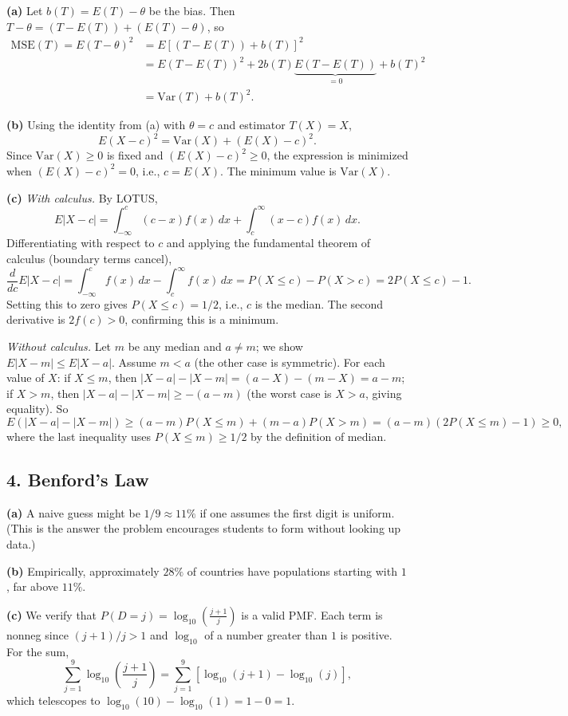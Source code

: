 \documentclass{article}
\begin{document}
\textbf{(a)} Let $b(T) = E(T) - \theta$ be the bias. Then $T - \theta = (T - E(T)) + (E(T) - \theta)$, so
\begin{align*}
\text{MSE}(T) = E(T-\theta)^2 &= E\!\left[(T-E(T)) + b(T)\right]^2 \\
&= E(T-E(T))^2 + 2b(T)\underbrace{E(T-E(T))}_{=0} + b(T)^2 \\
&= \text{Var}(T) + b(T)^2.
\end{align*}

\textbf{(b)} Using the identity from (a) with $\theta = c$ and estimator $T(X) = X$,
$$
E(X - c)^2 = \text{Var}(X) + (E(X) - c)^2.
$$
Since $\text{Var}(X) \ge 0$ is fixed and $(E(X)-c)^2 \ge 0$, the expression is minimized when $(E(X)-c)^2 = 0$, i.e., $c = E(X)$. The minimum value is $\text{Var}(X)$.

\textbf{(c)} \emph{With calculus.} By LOTUS,
$$
E|X - c| = \int_{-\infty}^c (c-x)f(x)\,dx + \int_c^{\infty}(x-c)f(x)\,dx.
$$
Differentiating with respect to $c$ and applying the fundamental theorem of calculus (boundary terms cancel),
$$
\frac{d}{dc}E|X-c| = \int_{-\infty}^c f(x)\,dx - \int_c^{\infty}f(x)\,dx = P(X \le c) - P(X > c) = 2P(X \le c) - 1.
$$
Setting this to zero gives $P(X \le c) = 1/2$, i.e., $c$ is the median. The second derivative is $2f(c) > 0$, confirming this is a minimum.

\emph{Without calculus.} Let $m$ be any median and $a \ne m$; we show $E|X - m| \le E|X - a|$. Assume $m < a$ (the other case is symmetric). For each value of $X$: if $X \le m$, then $|X - a| - |X - m| = (a-X) - (m-X) = a - m$; if $X > m$, then $|X-a| - |X-m| \ge -(a-m)$ (the worst case is $X > a$, giving equality). So
$$
E(|X-a| - |X-m|) \ge (a-m)P(X \le m) + (m-a)P(X > m) = (a-m)(2P(X\le m)-1) \ge 0,
$$
where the last inequality uses $P(X \le m) \ge 1/2$ by the definition of median.

\subsection*{4. Benford's Law}

\textbf{(a)} A naive guess might be $1/9 \approx 11\%$ if one assumes the first digit is uniform. (This is the answer the problem encourages students to form without looking up data.)

\textbf{(b)} Empirically, approximately $28\%$ of countries have populations starting with $1$, far above $11\%$.

\textbf{(c)} We verify that $P(D=j) = \log_{10}\!\left(\frac{j+1}{j}\right)$ is a valid PMF. Each term is nonneg since $(j+1)/j > 1$ and $\log_{10}$ of a number greater than $1$ is positive. For the sum,
$$
\sum_{j=1}^{9}\log_{10}\!\left(\frac{j+1}{j}\right) = \sum_{j=1}^9\!\left[\log_{10}(j+1) - \log_{10}(j)\right],
$$
which telescopes to $\log_{10}(10) - \log_{10}(1) = 1 - 0 = 1$.
\end{document}
